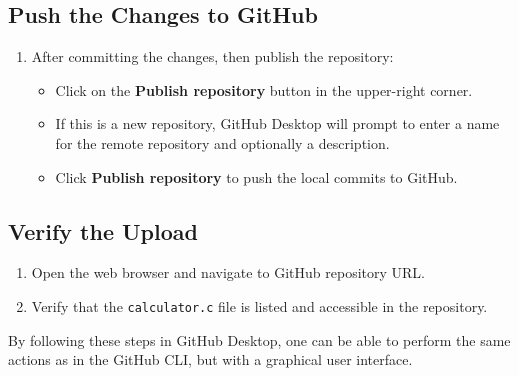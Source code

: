 \subsection{Push the Changes to GitHub}
\begin{enumerate}
    \item After committing the changes, then publish the repository:
    \begin{itemize}
        \item Click on the \textbf{Publish repository} button in the upper-right corner.
        \item If this is a new repository, GitHub Desktop will prompt to enter a name for the remote repository and optionally a description.
        \item Click \textbf{Publish repository} to push the local commits to GitHub.
    \end{itemize}
\end{enumerate}

\subsection{Verify the Upload}
\begin{enumerate}
    \item Open the web browser and navigate to GitHub repository URL.
    \item Verify that the \texttt{calculator.c} file is listed and accessible in the repository.
\end{enumerate}

By following these steps in GitHub Desktop, one can be able to perform the same actions as in the GitHub CLI, but with a graphical user interface. 
